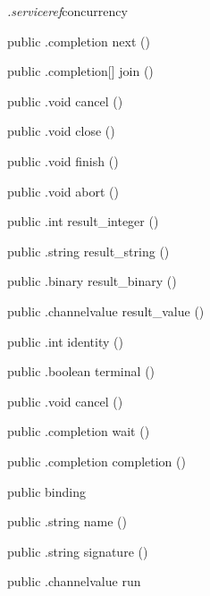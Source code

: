 \begin{CrexxClass}{\textit{.serviceref}}{concurrency}
\begin{Members}
    \Method
      {public}
      {.completion}
      {next}
      {()}

    \Method
      {public}
      {.completion[]}
      {join}
      {()}

    \Method
      {public}
      {.void}
      {cancel}
      {()}

    \Method
      {public}
      {.void}
      {close}
      {()}

    \Method
      {public}
      {.void}
      {finish}
      {()}

    \Method
      {public}
      {.void}
      {abort}
      {()}

    \Method
      {public}
      {.int}
      {result\_integer}
      {()}

    \Method
      {public}
      {.string}
      {result\_string}
      {()}

    \Method
      {public}
      {.binary}
      {result\_binary}
      {()}

    \Method
      {public}
      {.channelvalue}
      {result\_value}
      {()}

    \Method
      {public}
      {.int}
      {identity}
      {()}

    \Method
      {public}
      {.boolean}
      {terminal}
      {()}

    \Method
      {public}
      {.void}
      {cancel}
      {()}

    \Method
      {public}
      {.completion}
      {wait}
      {()}

    \Method
      {public}
      {.completion}
      {completion}
      {()}

    \Factory
      {public}
      {binding}
      {}

    \Method
      {public}
      {.string}
      {name}
      {()}

    \Method
      {public}
      {.string}
      {signature}
      {()}

    \Method
      {public}
      {.channelvalue}
      {run}
      {}


\end{Members}
\end{CrexxClass}
